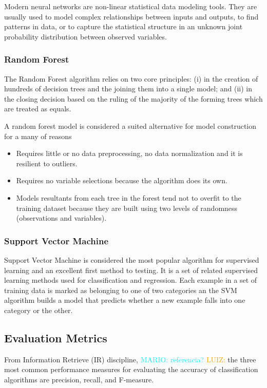 \documentclass[10pt, conference]{IEEEtran}
\newcommand{\luiz}[1]{\noindent\textcolor{orange}{LUIZ: {#1}}}
\newcommand{\mario}[1]{\noindent\textcolor{cyan}{MARIO: {#1}}}
\newcommand{\luiz}[1]{}
\newcommand{\mario}[1]{}
\begin{document}
Modern neural networks are non-linear statistical data modeling tools. They are usually used to model complex relationships between inputs and outputs, to find patterns in data, or to capture the statistical structure in an unknown joint probability distribution between observed variables.

\subsubsection{Random Forest}     \label{subsubsec:rf}
The Random Forest algorithm\cite{Breiman2001} relies on two core principles: (i) in the creation of hundreds of decision trees and the joining them into a single model; and (ii) in the closing decision based on the ruling of the majority of the forming trees which are treated as equals.

A random forest model is considered a suited alternative for model construction for a many of reasons\cite{Williams2011} 

\begin{itemize}
  \item Requires little or no data preprocessing, no data normalization and it is resilient to outliers.
  \item Requires no variable selections because the algorithm does its own.
  \item Models resultants from each tree in the forest tend not to overfit to the training dataset because they are built using two levels of randomness (observations and variables).
\end{itemize}

\subsubsection{Support Vector Machine}		\label{subsubsec:svm}
Support Vector Machine is considered the most popular algorithm for supervised learning and an excellent first method to testing\cite{Russell2010}. It is a set of related supervised learning methods used for classification and regression. Each example in a set of training data is marked as belonging to one of two categories an the SVM algorithm builds a model that predicts whether a new example falls into one category or the other. 

\subsection{Evaluation Metrics}	\label{subsec:metrics}
From Information Retrieve (IR) discipline, \mario{referencia?} \luiz{\cite{Feldman2007}}the three most common performance measures for evaluating the accuracy of classification algorithms are precision, recall, and F-measure. 
\end{document}
